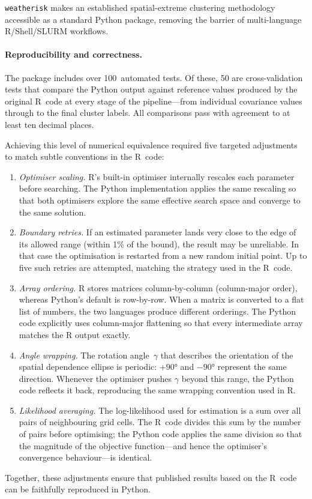 \documentclass[preprint,12pt,a4paper]{elsarticle}
\begin{document}
\texttt{weatherisk} makes an established spatial-extreme clustering
methodology accessible as a standard Python package, removing
the barrier of multi-language R/Shell/SLURM workflows.

\paragraph{Reproducibility and correctness.}
The package includes over 100~automated tests.  Of these, 50 are
cross-validation tests that compare the Python output against
reference values produced by the original R~code at every stage of
the pipeline---from individual covariance values through to the
final cluster labels.  All comparisons pass with agreement to
at least ten decimal places.

Achieving this level of numerical equivalence required five targeted
adjustments to match subtle conventions in the R~code:
\begin{enumerate}
\item \emph{Optimiser scaling.}
  R's built-in optimiser internally rescales each parameter before
  searching.  The Python implementation applies the same rescaling
  so that both optimisers explore the same effective search space
  and converge to the same solution.
\item \emph{Boundary retries.}
  If an estimated parameter lands very close to the edge of its
  allowed range (within 1\% of the bound), the result may be
  unreliable.  In that case the optimisation is restarted from a
  new random initial point.  Up to five such retries are attempted,
  matching the strategy used in the R~code.
\item \emph{Array ordering.}
  R stores matrices column-by-column (column-major order), whereas
  Python's default is row-by-row.  When a matrix is converted to a
  flat list of numbers, the two languages produce different
  orderings.  The Python code explicitly uses column-major flattening
  so that every intermediate array matches the R output exactly.
\item \emph{Angle wrapping.}
  The rotation angle~$\gamma$ that describes the orientation of
  the spatial dependence ellipse is periodic: $+90°$ and $-90°$
  represent the same direction.  Whenever the optimiser pushes
  $\gamma$ beyond this range, the Python code reflects it back,
  reproducing the same wrapping convention used in R.
\item \emph{Likelihood averaging.}
  The log-likelihood used for estimation is a sum over all pairs
  of neighbouring grid cells.  The R~code divides this sum by the
  number of pairs before optimising; the Python code applies the
  same division so that the magnitude of the objective function---and
  hence the optimiser's convergence behaviour---is identical.
\end{enumerate}
Together, these adjustments ensure that published results based on
the R~code can be faithfully reproduced in Python.
\end{document}
